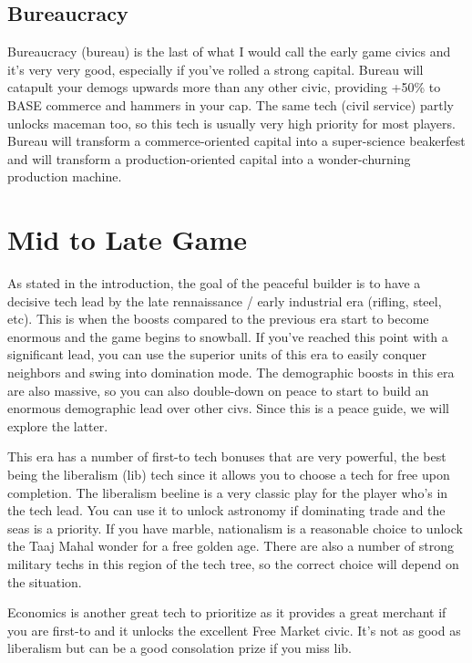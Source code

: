 \documentclass[10pt]{article}
\begin{document}
\subsection*{Bureaucracy}

Bureaucracy (bureau) is the last of what I would call the early game civics and it's very very good, especially
if you've rolled a strong capital. Bureau will catapult your demogs upwards more than any other civic, providing
+50\% to BASE commerce and hammers in your cap. The same tech (civil service) partly unlocks maceman too, so this
tech is usually very high priority for most players. Bureau will transform a commerce-oriented capital into a super-science
beakerfest and will transform a production-oriented capital into a wonder-churning production machine.

\section*{Mid to Late Game}

As stated in the introduction, the goal of the peaceful builder is to have a decisive tech lead by the late rennaissance / early industrial
era (rifling, steel, etc). This is when the boosts compared to the previous era start to become enormous and the
game begins to snowball. If you've reached this point with a significant lead, you can use the superior units of this era
to easily conquer neighbors and swing into domination mode. The demographic boosts in this era are also massive, so you can
also double-down on peace to start to build an enormous demographic lead over other civs. Since this is a peace guide, we will
explore the latter.

This era has a number of first-to tech bonuses that are very powerful, the best being the liberalism (lib) tech since it allows you
to choose a tech for free upon completion. The liberalism beeline is a very classic play for the player who's in the tech
lead. You can use it to unlock astronomy if dominating trade and the seas is a priority. If you have marble, nationalism is
a reasonable choice to unlock the Taaj Mahal wonder for a free golden age. There are also a number of strong military techs in
this region of the tech tree, so the correct choice will depend on the situation.

Economics is another great tech to prioritize as it provides a great merchant if you are first-to and it unlocks the excellent
Free Market civic. It's not as good as liberalism but can be a good consolation prize if you miss lib.
\end{document}
